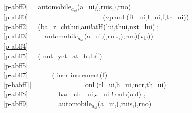 {\mnewfoil\LLLL
\bp
\ref{p-abff0}\ \ \ automobile$_{a_{ui}}$(a\_ui,({\LBRACE}{\RBRACE},ruis,{\LBRACE}{\RBRACE}),rno)\\
\ref{p-abff0}\ \ \ \ \ \ \ \ \ \ \ \ \ \ \ \ \ \ \ \ \ \ (vp:onL(fh\_ui,l\_ui,f,th\_ui)) {\IS}\\
\ref{p-abff2}\ \ \ (ba\_r\_ch{\LBRACKET}thui,aui{\RBRACKET}!atH(lui,thui,nxt\_lui) ;\\
\ref{p-abff3}\ \ \ \ \ automobile$_{a_{ui}}$(a\_ui,({\LBRACE}{\RBRACE},ruis,{\LBRACE}{\RBRACE}),rno)(vp))\ \ \\
\ref{p-abff4}\ \ \ \ \ {\NONDETCHOICE}\ \ \ \ \ \ \\
\ref{p-abff5}\ \ \ ( not\_yet\_at\_hub(f)\ \ \ \ \ \\
\ref{p-abff5}\ \ \ \ \ \ \ \ \\
\ref{p-abff7}\ \ \ \ \ \ \ ( incr {\EQ} increment(f) \\
\ref{p-habff1}\ \ \ \ \ \ \ \ \ \ \ \ \ \ \  onl {\EQ} (tl\_ui,h\_ui,incr,th\_ui) \\
\ref{p-abff8}\ \ \ \ \ \ \ \ \ ba{\MINUS}r\_ch{\LBRACKET}l\_ui,a\_ui{\RBRACKET} ! onL(onl) ;\ \ \ \ \\
\ref{p-abff9}\ \ \ \ \ \ \ \ \ automobile$_{a_{ui}}$(a\_ui,({\LBRACE}{\RBRACE},ruis,{\LBRACE}{\RBRACE}),rno)\ \ \ \\
}
